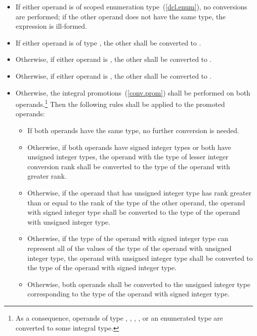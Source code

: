 \begin{itemize}
\item If either operand is of scoped enumeration type~(\ref{dcl.enum}), no conversions
are performed; if the other operand does not have the same type, the expression is
ill-formed.

\item If either operand is of type  , the
other shall be converted to  .

\item Otherwise, if either operand is , the other shall be
converted to .

\item Otherwise, if either operand is , the other shall be
converted to .

\item Otherwise, the integral promotions~(\ref{conv.prom}) shall be
performed on both operands.\footnote{As a consequence, operands of type , ,
, , or an enumerated type are converted
to some integral type.}
Then the following rules shall be applied to the promoted operands:

\begin{itemize}

\item If both operands have the same type, no further conversion is
needed.

\item Otherwise, if both operands have signed integer types or both have
unsigned integer types, the operand with the type of lesser integer
conversion rank shall be converted to the type of the operand with
greater rank.

\item Otherwise, if the operand that has unsigned integer type has rank
greater than or equal to the rank of the type of the other operand, the
operand with signed integer type shall be converted to the type of the
operand with unsigned integer type.

\item Otherwise, if the type of the operand with signed integer type can
represent all of the values of the type of the operand with unsigned
integer type, the operand with unsigned integer type shall be converted
to the type of the operand with signed integer type.

\item Otherwise, both operands shall be converted to the unsigned
integer type corresponding to the type of the operand with signed
integer type.
\end{itemize}
\end{itemize}

